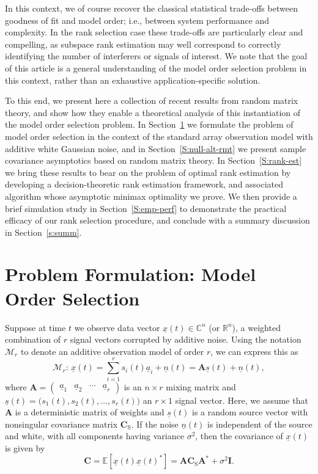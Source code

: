 \documentclass[final]{IEEEtran} %
\newcommand{\vectorsymbol}{\underline}
\newcommand{\matrixsymbol}{\boldsymbol}
\newcommand{\mA}{\matrixsymbol{A}}
\newcommand{\mC}{\matrixsymbol{C}}
\newcommand{\mCs}{\matrixsymbol{C}_\text{S}}
\newcommand{\mI}{\matrixsymbol{I}}
\newcommand{\va}{\vectorsymbol{a}}
\newcommand{\vn}{\vectorsymbol{n}}
\newcommand{\vs}{\vectorsymbol{s}}
\newcommand{\vx}{\vectorsymbol{x}}
\newcommand{\reals}{\mathbb{R}}
\newcommand{\complexes}{\mathbb{C}}
\newcommand{\E}{\mathbb{E}}
\begin{document}
In this context, we of course recover the classical statistical trade-offs between goodness of fit and model order; i.e., between system performance and complexity.  In the rank selection case these trade-offs are particularly clear and compelling, as subspace rank estimation may well correspond to correctly identifying the number of interferers or signals of interest.  We note that the goal of this article is a general understanding of the model order selection problem in this context, rather than an exhaustive application-specific solution.

To this end, we present here a collection of recent results from random matrix theory, and show how they enable a theoretical analysis of this instantiation of the model order selection problem.  In Section~\ref{S:prob-state} we formulate the problem of model order selection  in the context of the standard array observation model with additive white Gaussian noise, and in Section~\ref{S:null-alt-rmt} we present sample covariance asymptotics based on random matrix theory.  In Section~\ref{S:rank-est} we bring these results to bear on the problem of optimal rank estimation by developing a decision-theoretic rank estimation framework, and associated algorithm whose asymptotic minimax optimality we prove.  We then provide a brief simulation study in Section~\ref{S:emp-perf} to demonstrate the practical efficacy of our rank selection procedure, and conclude with a summary discussion in Section~\ref{s:summ}.

\section{Problem Formulation: Model Order Selection}
\label{S:prob-state}

Suppose at time $t$ we observe data vector $\vx(t) \in \complexes^n$
(or $\reals^n$), a weighted combination of $r$ signal vectors corrupted
by additive noise.  Using the notation $\mathcal{M}_r$ to denote an additive observation model of order $r$, we can express this as
\begin{equation}\label{E:Signal}
    \mathcal{M}_r\!:\, \vx(t) = \sum_{i=1}^{r} s_{i}(t) \va_{i} + \vn(t) = \mA \vs(t) + \vn(t),
\end{equation}
where
\(
    \mA
    =
    \left(
    \begin{matrix}
        \va_{1} & \va_{2} & \cdots & \va_{r}
    \end{matrix}
    \right)
\)
is an $n \times r$ mixing matrix and
\(
    \vs(t)
    =
    \big(
        s_1(t), s_2(t), \ldots, s_r(t)
    \big)
\)
an $r \times 1$ signal vector.  Here, we assume that $\mA$ is a deterministic matrix of weights and
$\vs(t)$ is a random source vector with nonsingular covariance matrix $\mCs$.
If the noise $\vn(t)$ is independent of the source and white, with
all components having variance $\sigma^2$, then the covariance of $\vx(t)$ is
given by
\begin{equation}\label{E:C-decomp}
    \mC
    =
    \E\left[ \vx(t) \vx(t)^* \right]
    =
    \mA \mCs \mA^* + \sigma^2 \mI.
\end{equation}
\end{document}
